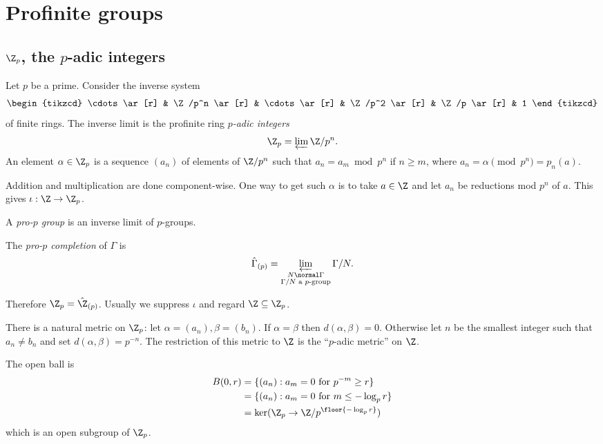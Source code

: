 \documentclass[a4paper]{article}
\begin{document}
\section{Profinite groups}

\subsection{\(\Z_p\), the \(p\)-adic integers}

Let \(p\) be a prime. Consider the inverse system
\[
  \begin{tikzcd}
    \cdots \ar[r] & \Z/p^n \ar[r] & \cdots \ar[r] & \Z/p^2 \ar[r] & \Z/p \ar[r] & 1
  \end{tikzcd}
\]
of finite rings. The inverse limit is the profinite ring \emph{\(p\)-adic integers}
\[
  \Z_p = \varprojlim \Z/p^n.
\]
An element \(\alpha \in \Z_p\) is a sequence \((a_n)\) of elements of \(\Z/p^n\) such that \(a_n = a_m \bmod{p^n}\) if \(n \geq m\), where \(a_n = \alpha \pmod{p^n} = p_n(a)\).

Addition and multiplication are done component-wise. One way to get such \(\alpha\) is to take \(a \in \Z\) and let \(a_n\) be reductions mod \(p^n\) of \(a\). This gives \(\iota: \Z \to \Z_p\).

\begin{definition}
  A \emph{pro-\(p\) group} is an inverse limit of \(p\)-groups.

  The \emph{pro-\(p\) completion} of \(\Gamma\) is
  \[
    \hat \Gamma_{(p)} = \varprojlim_{\substack{N \normal \Gamma \\ \Gamma/N \text{ a \(p\)-group}}} \Gamma/N.
  \]
\end{definition}

Therefore \(\Z_p = \hat \Z_{(p)}\). Usually we suppress \(\iota\) and regard \(\Z \subseteq \Z_p\).

There is a natural metric on \(\Z_p\): let \(\alpha = (a_n), \beta = (b_n)\). If \(\alpha = \beta\) then \(d(\alpha, \beta) = 0\). Otherwise let \(n\) be the smallest integer such that \(a_n \ne b_n\) and set \(d(\alpha, \beta) = p^{-n}\). The restriction of this metric to \(\Z\) is the ``\(p\)-adic metric'' on \(\Z\).

The open ball is
\begin{align*}
  B(0, r)
  &= \{(a_n): a_m = 0 \text{ for } p^{-m} \geq r\} \\
  &= \{(a_n): a_m = 0 \text{ for } m \leq -\log_p r\} \\
  &= \ker(\Z_p \to \Z/p^{\floor{-\log_p r}})
\end{align*}
which is an open subgroup of \(\Z_p\).
\end{document}
